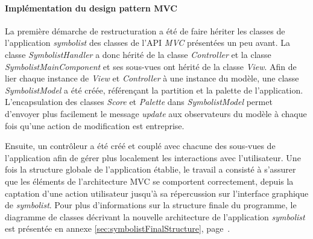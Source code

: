 \paragraph{Implémentation du design pattern MVC} La première démarche de restructuration a été de faire hériter les classes de l'application \textit{symbolist} des classes de l'API \textit{MVC} présentées un peu avant.
La classe \textit{SymbolistHandler} a donc hérité de la classe \textit{Controller} et la classe \textit{SymbolistMainComponent} et ses sous-vues ont hérité de la classe \textit{View}.
Afin de lier chaque instance de \textit{View} et \textit{Controller} à une instance du modèle, une classe \textit{SymbolistModel} a été créée, référençant la partition et la palette de l'application.
L'encapsulation des classes \textit{Score} et \textit{Palette} dans \textit{SymbolistModel} permet d'envoyer plus facilement le message \textit{update} aux observateurs du modèle à chaque fois qu'une action de modification est entreprise.

Ensuite, un contrôleur a été créé et couplé avec chacune des sous-vues de l'application afin de gérer plus localement les interactions avec l'utilisateur.  
Une fois la structure globale de l'application établie, le travail a consisté à s'assurer que les éléments de l'architecture MVC se comportent correctement, depuis la captation d'une action utilisateur jusqu'à sa répercussion sur l'interface graphique de \textit{symbolist}.
Pour plus d'informations sur la structure finale du programme, le diagramme de classes décrivant la nouvelle architecture de l'application \textit{symbolist} est présentée en annexe \ref{sec:symbolistFinalStructure}, page~\pageref{sec:symbolistFinalStructure}. 
